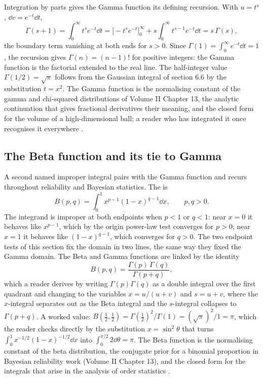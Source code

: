 Integration by parts gives the Gamma function its defining recursion.
With $u = t^{s}$, $\dd v = e^{-t}\dd t$,
\[
\Gamma(s + 1) = \int_{0}^{\infty} t^{s}e^{-t}\dd t =
\bigl[-t^{s}e^{-t}\bigr]_{0}^{\infty} + s\int_{0}^{\infty}
t^{s-1}e^{-t}\dd t = s\,\Gamma(s),
\]
the boundary term vanishing at both ends for $s > 0$. Since
$\Gamma(1) = \int_{0}^{\infty}e^{-t}\dd t = 1$, the recursion gives
$\Gamma(n) = (n-1)!$ for positive integers: the Gamma function is the
factorial extended to the real line. The half-integer value
$\Gamma(1/2) = \sqrt{\pi}$ follows from the Gaussian integral of
section 6.6 by the substitution $t = x^{2}$. The Gamma function is
the normalising constant of the gamma and chi-squared distributions
of Volume II Chapter 13, the analytic continuation that gives
fractional derivatives their meaning, and the closed form for the
volume of a high-dimensional ball; a reader who has integrated it
once recognises it everywhere \cite{text:v2ch06-apostol-calculus}.

\subsection{The Beta function and its tie to Gamma}

A second named improper integral pairs with the Gamma function and
recurs throughout reliability and Bayesian statistics. The
 is
\[
B(p, q) = \int_{0}^{1} x^{p-1}(1 - x)^{q-1}\dd x, \qquad p, q > 0.
\]
The integrand is improper at both endpoints when $p < 1$ or $q < 1$:
near $x = 0$ it behaves like $x^{p-1}$, which by the origin power-law
test converges for $p > 0$; near $x = 1$ it behaves like
$(1 - x)^{q-1}$, which converges for $q > 0$. The two endpoint tests
of this section fix the domain in two lines, the same way they fixed
the Gamma domain. The Beta and Gamma functions are linked by the
identity
\[
B(p, q) = \frac{\Gamma(p)\,\Gamma(q)}{\Gamma(p + q)},
\]
which a reader derives by writing $\Gamma(p)\Gamma(q)$ as a double
integral over the first quadrant and changing to the variables
$x = u/(u + v)$ and $s = u + v$, where the $x$-integral separates out
as the Beta integral and the $s$-integral collapses to $\Gamma(p +
q)$. A worked value: $B(\tfrac{1}{2}, \tfrac{1}{2}) = \Gamma(\tfrac{1}
{2})^{2}/\Gamma(1) = (\sqrt{\pi})^{2}/1 = \pi$, which the reader checks
directly by the substitution $x = \sin^{2}\theta$ that turns
$\int_{0}^{1} x^{-1/2}(1 - x)^{-1/2}\dd x$ into $\int_{0}^{\pi/2}
2\dd\theta = \pi$. The Beta function is the normalising constant of
the beta distribution, the conjugate prior for a binomial proportion
in Bayesian reliability work (Volume II Chapter 13), and the closed
form for the integrals that arise in the analysis of order statistics
\cite{text:v2ch06-apostol-calculus}.

